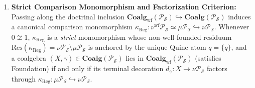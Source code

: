 \begin{theorem}
\begin{enumerate}
  \item \textbf{Strict Comparison Monomorphism and Factorization Criterion:} Passing along the doctrinal inclusion $\mathbf{Coalg}_{\mathrm{wf}}(\mathcal{P}_{\mathcal{S}}) \hookrightarrow \mathbf{Coalg}(\mathcal{P}_{\mathcal{S}})$ induces a canonical comparison monomorphism $\kappa_{\mathrm{Reg}} : \nu^{\mathrm{wf}} \mathcal{P}_{\mathcal{S}} \simeq \mu \mathcal{P}_{\mathcal{S}} \hookrightarrow \nu \mathcal{P}_{\mathcal{S}}$. Whenever $0 \not\cong 1$, $\kappa_{\mathrm{Reg}}$ is a \emph{strict} monomorphism whose non-well-founded residuum $\mathrm{Res}(\kappa_{\mathrm{Reg}}) = \nu \mathcal{P}_{\mathcal{S}} \setminus \mu \mathcal{P}_{\mathcal{S}}$ is anchored by the unique Quine atom $q = \{q\}$, and a coalgebra $(X, \gamma) \in \mathbf{Coalg}(\mathcal{P}_{\mathcal{S}})$ lies in $\mathbf{Coalg}_{\mathrm{wf}}(\mathcal{P}_{\mathcal{S}})$ (satisfies Foundation) if and only if its terminal decoration $d_\gamma : X \to \nu \mathcal{P}_{\mathcal{S}}$ factors through $\kappa_{\mathrm{Reg}} : \mu \mathcal{P}_{\mathcal{S}} \hookrightarrow \nu \mathcal{P}_{\mathcal{S}}$.
\end{enumerate}
\end{theorem}

